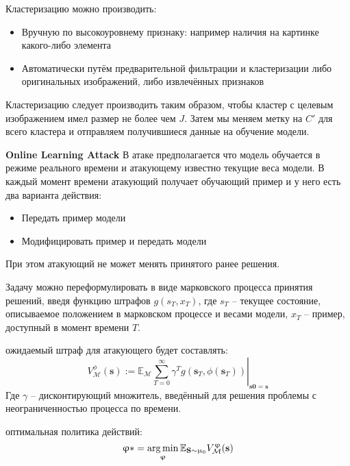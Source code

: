 Кластеризацию можно производить:
\begin{itemize}
    \item Вручную по высокоуровнему признаку: например наличия на картинке какого-либо элемента
    \item Автоматически путём предварительной фильтрации и кластеризации либо оригинальных изображений, либо извлечённых признаков
\end{itemize}

Кластеризацию следует производить таким образом, чтобы кластер с целевым изображением имел размер не более чем $J$. Затем мы меняем метку на $C'$ для всего кластера и отправляем получившиеся данные на обучение модели.


\textbf{Online Learning Attack}
В атаке предполагается что модель обучается в режиме реального времени и атакующему известно текущие веса модели. В каждый момент времени атакующий получает обучающий пример и у него есть два варианта действия:
\begin{itemize}
    \item Передать пример модели
    \item Модифицировать пример и передать модели
\end{itemize}

При этом атакующий не может менять принятого ранее решения.

Задачу можно переформулировать в виде марковского процесса принятия решений, введя функцию штрафов $g(s_T, x_T)$, где $s_T$ – текущее состояние, описываемое положением в марковском процессе и весами модели, $x_T$ – пример, доступный в момент времени $T$.

 ожидаемый штраф для атакующего будет составлять:
$$V_{\mathcal{M}}^{\phi}(\mathbf{s}):=\left.\mathbb{E}_{\mathcal{M}} \sum_{T=0}^{\infty} \gamma^{T} g\left(\mathbf{s}_{T}, \phi\left(\mathbf{s}_{T}\right)\right)\right|_{\mathbf{s0}=\mathbf{s}}$$
Где $\gamma$ – дисконтирующий множитель, введённый для решения проблемы с неограниченностью процесса по времени.


 оптимальная политика действий:
$$
\upvarphi* = \operatorname*{arg\,min}_{\upvarphi} \mathbb{E}_{\mathbf{S} \sim \upmu_{0}} V_{\mathcal{M}}^{\upvarphi}(\mathbf{s})
$$
